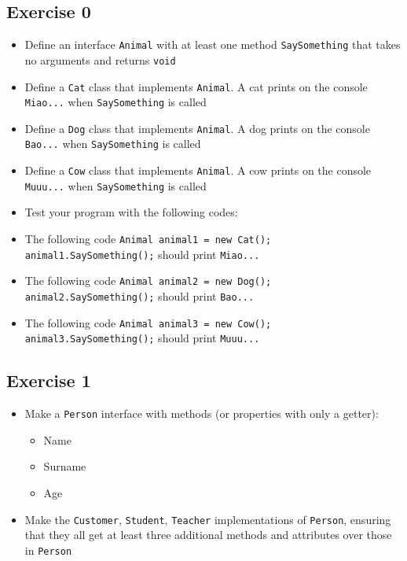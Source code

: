 		\subsection{Exercise 0}
		\begin{myprop}
	    \begin{itemize}
	    	\item Define an interface \texttt{Animal} with at least one method \texttt{SaySomething} that takes no arguments and returns \texttt{void}
	    	\item Define a \texttt{Cat} class that implements \texttt{Animal}. A cat prints on the console \texttt{Miao...} when \texttt{SaySomething} is called
	    	\item Define a \texttt{Dog} class that implements \texttt{Animal}. A dog prints on the console \texttt{Bao...} when \texttt{SaySomething} is called
	    	\item Define a \texttt{Cow} class that implements \texttt{Animal}. A cow prints on the console \texttt{Muuu...} when \texttt{SaySomething} is called
	    	\item[] Test your program with the following codes:
	    	\item The following code \texttt{Animal animal1 = new Cat(); animal1.SaySomething();} should print \texttt{Miao...}
	    	\item The following code \texttt{Animal animal2 = new Dog(); animal2.SaySomething();} should print \texttt{Bao...}
	    	\item The following code \texttt{Animal animal3 = new Cow(); animal3.SaySomething();} should print \texttt{Muuu...}
	    \end{itemize}
	    \end{myprop}
	    
    	\subsection{Exercise 1}
    	\begin{itemize}
    		\item Make a \texttt{Person} interface with methods (or properties with only a getter):
    		\begin{itemize}
    			\item Name
    			\item Surname
    			\item Age
    		\end{itemize}
    		
    		\item Make the \texttt{Customer}, \texttt{Student}, \texttt{Teacher} implementations of \texttt{Person}, ensuring that they all get at least three additional methods and attributes over those in \texttt{Person}
    	\end{itemize}
    	

